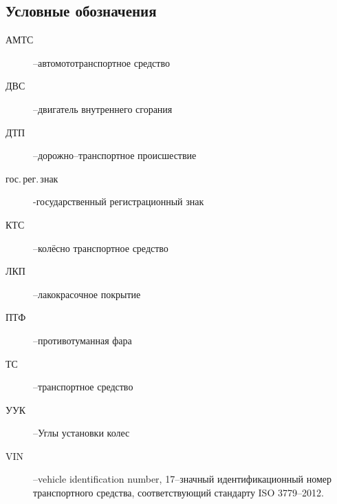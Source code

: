 \subsection{Условные обозначения}
\begin{description}
%	 
\item[АМТС] --автомототранспортное средство
\item[ДВС] --двигатель внутреннего сгорания
\item[ДТП] --дорожно--транспортное происшествие
\item[гос.\,рег.\,знак] -государственный регистрационный знак
\item[КТС] --колёсно транспортное средство 
\item[ЛКП] --лакокрасочное покрытие
\item[ПТФ] --противотуманная фара 
\item[ТС] --транспортное средство
\item[УУК] --Углы установки колес
\item[VIN] --vehicle identification number, 17--значный идентификационный номер транспортного средства, соответствующий стандарту ISO 3779--2012.
%
\end{description}
%
